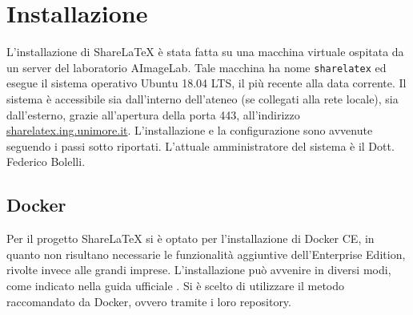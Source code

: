 \chapter{Installazione}
\label{Installazione}
\thispagestyle{plain}

L'installazione di ShareLaTeX è stata fatta su una macchina virtuale ospitata da un server del laboratorio AImageLab. Tale macchina ha nome \verb|sharelatex| ed esegue il sistema operativo Ubuntu 18.04 LTS, il più recente alla data corrente. Il sistema è accessibile sia dall'interno dell'ateneo (se collegati alla rete locale), sia dall'esterno, grazie all'apertura della porta 443, all'indirizzo \url{sharelatex.ing.unimore.it}. L'installazione e la configurazione sono avvenute seguendo i passi sotto riportati. L'attuale amministratore del sistema è il Dott. Federico Bolelli.

\section{Docker}
Per il progetto ShareLaTeX si è optato per l'installazione di Docker CE, in quanto non risultano necessarie le funzionalità aggiuntive dell'Enterprise Edition, rivolte invece alle grandi imprese. L'installazione può avvenire in diversi modi, come indicato nella guida ufficiale \cite{docker_install}. Si è scelto di utilizzare il metodo raccomandato da Docker, ovvero tramite i loro repository.


